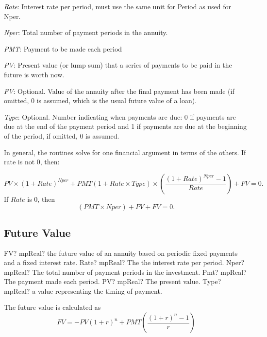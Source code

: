 \textit{Rate}: Interest rate per period, must use the same unit for Period as used for Nper.

\textit{Nper}: Total number of payment periods in the annuity.

\textit{PMT}: Payment to be made each period

\textit{PV}: Present value (or lump sum) that a series of payments to be paid in the future is worth now.

\textit{FV}: Optional. Value of the annuity after the final payment has been made (if omitted, 0 is assumed, which is the usual future value of a loan).

\textit{Type}: Optional. Number indicating when payments are due: 0 if payments are due at the end of the payment period and 1 if payments are due at the beginning of the period, if omitted, 0 is assumed.

In general, the routines solve for  one financial argument in terms of the others. If rate is not 0, then: 

\begin{equation}
	PV \times (1+Rate)^{Nper} + PMT(1+Rate \times Type) \times \left(\frac{(1+Rate)^{Nper}-1}{Rate}\right)+FV=0.
\end{equation}
If $Rate$ is 0, then 
\begin{equation}
	(PMT \times Nper) + PV + FV =0.
\end{equation}


\subsection{Future Value}

\begin{mpFunctionsExtract}
	\mpWorksheetFunctionFiveNotImplemented
	{FV? mpReal? the future value of an annuity based on periodic fixed payments and a fixed interest rate.}
	{Rate? mpReal? The the interest rate per period.}
	{Nper? mpReal? The total number of payment periods in the investment.}
	{Pmt? mpReal? The payment made each period.}
	{PV? mpReal? The present value.}
	{Type? mpReal? a value representing the timing of payment.}
\end{mpFunctionsExtract}

\vspace{0.3cm}
The future value is calculated as
\begin{equation}
	FV = -PV(1+r)^n + PMT\left( \frac{(1+r)^n - 1}{r} \right)
\end{equation}





